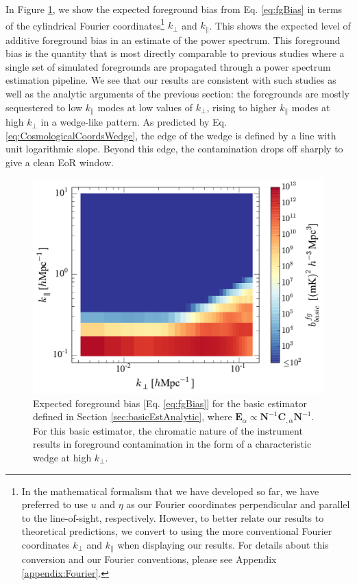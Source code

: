 \documentclass[twocolumn,aps,prd,nofootinbib,showpacs]{revtex4-1}
\begin{document}
In Figure \ref{fig:basicEstBias}, we show the expected foreground bias from  Eq. \eqref{eq:fgBias} in terms of the cylindrical Fourier coordinates\footnote{In the mathematical formalism that we have developed so far, we have preferred to use $u$ and $\eta$ as our Fourier coordinates perpendicular and parallel to the line-of-sight, respectively.  However, to better relate our results to theoretical predictions, we convert to using the more conventional Fourier coordinates $k_\perp$ and $k_\parallel$ when displaying our results.  For details about this conversion and our Fourier conventions, please see Appendix \ref{appendix:Fourier}.} $k_\perp$ and $k_\parallel$.  This shows the expected level of additive foreground bias in an estimate of the power spectrum.  This foreground bias is the quantity that is most directly comparable to previous studies where a single set of simulated foregrounds are propagated through a power spectrum estimation pipeline.  We see that our results are consistent with such studies as well as the analytic arguments of the previous section: the foregrounds are mostly sequestered to low $k_\parallel$ modes at low values of $k_\perp$, rising to higher $k_\parallel$ modes at high $k_\perp$ in a wedge-like pattern.  As predicted by  Eq. \eqref{eq:CosmologicalCoordsWedge}, the edge of the wedge is defined by a line with unit logarithmic slope.  Beyond this edge, the contamination drops off sharply to give a clean EoR window.

\begin{figure}[t] 
	\centering 
	\includegraphics[width=.49\textwidth]{figures/simpleEstBias.pdf}
	\caption{Expected foreground bias [Eq. \eqref{eq:fgBias}] for the basic estimator defined in Section \ref{sec:basicEstAnalytic}, where $\mathbf{E}_\alpha \propto \mathbf{N}^{-1} \mathbf{C}_{,\alpha} \mathbf{N}^{-1}$.  For this basic estimator, the chromatic nature of the instrument results in foreground contamination in the form of a characteristic wedge at high $k_\perp$.}
	\label{fig:basicEstBias}
\end{figure} 
\end{document}
